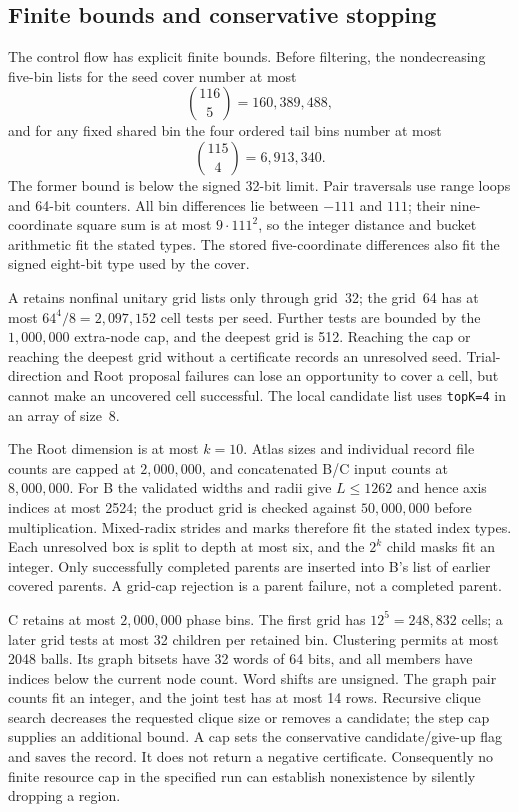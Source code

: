 \subsection{Finite bounds and conservative stopping}
\label{execute:bounds}

The control flow has explicit finite bounds. Before filtering, the
nondecreasing five-bin lists for the seed cover number at most
\[
 \binom{116}{5}=160{,}389{,}488,
\]
and for any fixed shared bin the four ordered tail bins number at most
\[
 \binom{115}{4}=6{,}913{,}340.
\]
The former bound is below the signed 32-bit limit. Pair traversals use
range loops and 64-bit counters. All bin differences lie between $-111$
and $111$; their nine-coordinate square sum is at most $9\cdot111^2$,
so the integer distance and bucket arithmetic fit the stated types.
The stored five-coordinate differences also fit the signed eight-bit
type used by the cover.

A retains nonfinal unitary grid lists only through grid~32; the grid~64
has at most $64^4/8=2{,}097{,}152$ cell tests per seed. Further tests
are bounded by the $1{,}000{,}000$ extra-node cap, and the deepest
grid is 512. Reaching the cap or reaching the deepest grid without a
certificate records an unresolved seed. Trial-direction and Root
proposal failures can lose an opportunity to cover a cell, but cannot
make an uncovered cell successful. The local candidate list uses
\texttt{topK=4} in an array of size~8.

The Root dimension is at most $k=10$. Atlas sizes and individual record
file counts are capped at $2{,}000{,}000$, and concatenated B/C input
counts at $8{,}000{,}000$. For B the validated widths and radii give
$L\le1262$ and hence axis indices at most 2524; the product grid is
checked against $50{,}000{,}000$ before multiplication. Mixed-radix
strides and marks therefore fit the stated index types. Each unresolved
box is split to depth at most six, and the $2^k$ child masks fit an
integer. Only successfully completed parents are inserted into B's
list of earlier covered parents. A grid-cap rejection is a parent
failure, not a completed parent.

C retains at most $2{,}000{,}000$ phase bins. The first grid has
$12^5=248{,}832$ cells; a later grid tests at most 32 children per
retained bin. Clustering permits at most 2048 balls. Its graph bitsets
have 32 words of 64 bits, and all members have indices below the current
node count. Word shifts are unsigned. The graph pair counts fit an
integer, and the joint test has at most 14 rows. Recursive clique
search decreases the requested clique size or removes a candidate;
the step cap supplies an additional bound. A cap sets the conservative
candidate/give-up flag and saves the record. It does not return a
negative certificate. Consequently no finite resource cap in the
specified run can establish nonexistence by silently dropping a region.

